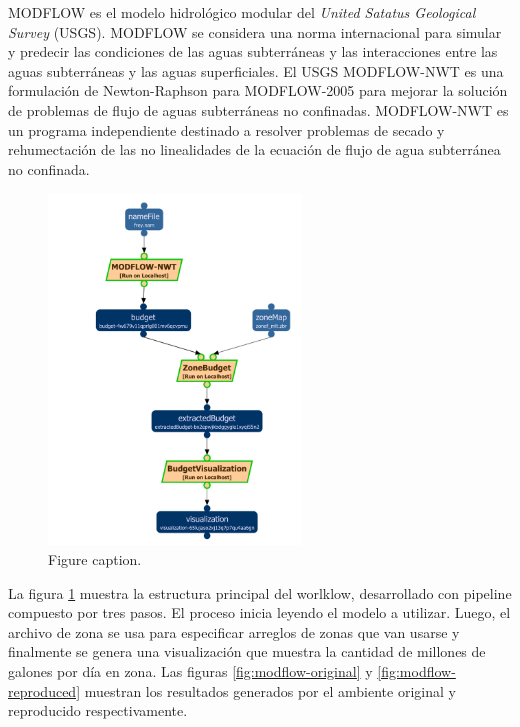 MODFLOW es el modelo hidrológico modular del \textit{United Satatus Geological Survey} (USGS). MODFLOW se considera una norma internacional para simular y predecir las condiciones de las aguas subterráneas y las interacciones entre las aguas subterráneas y las aguas superficiales.
El USGS MODFLOW-NWT es una formulación de Newton-Raphson para MODFLOW-2005 para mejorar la solución de problemas de flujo de aguas subterráneas no confinadas. MODFLOW-NWT es un programa independiente destinado a resolver problemas de secado y rehumectación de las no linealidades de la ecuación de flujo de agua subterránea no confinada.


\begin{figure}[t]
\centering
\includegraphics[width=0.6\textwidth]{Figures/usgs-modflow-nwt}
\caption{Figure caption.}\label{fig:modflow}
\end{figure}


La figura \ref{fig:modflow} muestra la estructura principal del worlklow, desarrollado con pipeline compuesto por tres pasos. El proceso inicia leyendo el modelo a utilizar. Luego, el archivo de zona se usa para especificar arreglos de zonas que van usarse y finalmente se genera una visualización que muestra la cantidad de millones de galones por día en zona. Las figuras \ref{fig:modflow-original} y \ref{fig:modflow-reproduced} muestran los resultados generados por el ambiente original y reproducido respectivamente.

